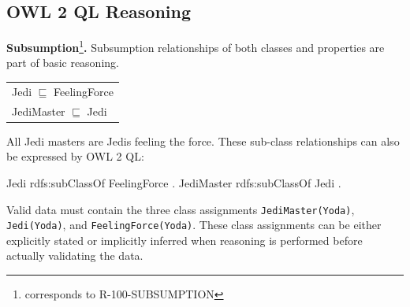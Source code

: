 \documentclass{llncs}
\newcommand{\ms}[1]{\texttt{#1}}
\newenvironment{DL}{
  \scriptsize
  \sffamily
  \vspace{0.3cm}
  \begin{tabular}{l}

}{
  \end{tabular}
  \linebreak
}
\begin{document}
%

\subsection{OWL 2 QL Reasoning}

\textbf{Subsumption}\footnote{corresponds to R-100-SUBSUMPTION}\textbf{.}
Subsumption relationships of both classes and properties are part of basic reasoning.

\begin{DL}
Jedi $\sqsubseteq$ FeelingForce \\
JediMaster $\sqsubseteq$ Jedi \\
\end{DL}

All Jedi masters are Jedis feeling the force.
These sub-class relationships can also be expressed by OWL 2 QL:

\begin{ex}
Jedi rdfs:subClassOf FeelingForce . 
JediMaster rdfs:subClassOf Jedi . 
\end{ex}

Valid data must contain the three class assignments \ms{JediMaster(Yoda)}, \ms{Jedi(Yoda)}, and \ms{FeelingForce(Yoda)}.
These class assignments can be either explicitly stated or implicitly inferred when reasoning is performed before actually validating the data.
\end{document}
